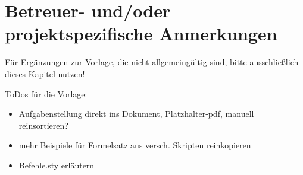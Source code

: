 \chapter{Betreuer- und/oder projektspezifische Anmerkungen}
Für Ergänzungen zur Vorlage, die nicht allgemeingültig sind, bitte ausschließlich dieses Kapitel nutzen!

ToDos für die Vorlage:
\begin{itemize}
	\item Aufgabenstellung direkt ins Dokument, Platzhalter-pdf, manuell reinsortieren?
	\item mehr Beispiele für Formelsatz aus versch. Skripten reinkopieren
	\item Befehle.sty erläutern
\end{itemize}